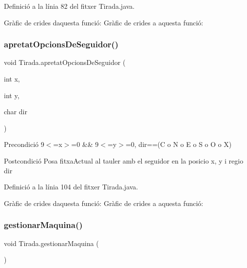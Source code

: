 Definició a la línia 82 del fitxer Tirada.\+java.

Gràfic de crides d\textquotesingle{}aquesta funció\+:
Gràfic de crides a aquesta funció\+:
\mbox{\label{class_tirada_a3c80bfbaa14b427b0221446e22fceeac}} 
\subsubsection{\texorpdfstring{apretat\+Opcions\+De\+Seguidor()}{apretatOpcionsDeSeguidor()}}
{\footnotesize\ttfamily void Tirada.\+apretat\+Opcions\+De\+Seguidor (\begin{DoxyParamCaption}\item[{int}]{x,  }\item[{int}]{y,  }\item[{char}]{dir }\end{DoxyParamCaption})}

\begin{DoxyPrecond}{Precondició}
9$<$=x$>$=0 \&\& 9$<$=y$>$=0, dir==(\textquotesingle{}C\textquotesingle{} o \textquotesingle{}N\textquotesingle{} o \textquotesingle{}E\textquotesingle{} o \textquotesingle{}S\textquotesingle{} o \textquotesingle{}O\textquotesingle{} o \textquotesingle{}X\textquotesingle{}) 
\end{DoxyPrecond}
\begin{DoxyPostcond}{Postcondició}
Posa fitxa\+Actual al tauler amb el seguidor en la posicio x, y i regio dir 
\end{DoxyPostcond}


Definició a la línia 104 del fitxer Tirada.\+java.

Gràfic de crides d\textquotesingle{}aquesta funció\+:
Gràfic de crides a aquesta funció\+:
\mbox{\label{class_tirada_a45701d44ba8daf5236f4cf945ce81c34}} 
\subsubsection{\texorpdfstring{gestionar\+Maquina()}{gestionarMaquina()}}
{\footnotesize\ttfamily void Tirada.\+gestionar\+Maquina (\begin{DoxyParamCaption}{ }\end{DoxyParamCaption})\hspace{0.3cm}{\ttfamily [private]}}

